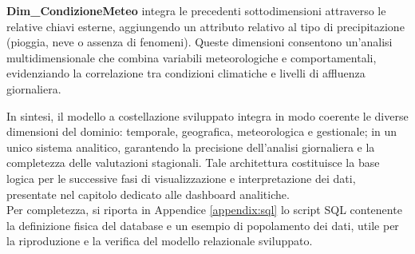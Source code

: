 \textbf{Dim\_CondizioneMeteo} integra le precedenti sottodimensioni attraverso le relative chiavi esterne, aggiungendo un attributo relativo al tipo di precipitazione (pioggia, neve o assenza di fenomeni).
Queste dimensioni consentono un’analisi multidimensionale che combina variabili meteorologiche e comportamentali, evidenziando la correlazione tra condizioni climatiche e livelli di affluenza giornaliera.

In sintesi, il modello a costellazione sviluppato integra in modo coerente le diverse dimensioni del dominio: temporale, geografica, meteorologica e gestionale; in un unico sistema analitico, garantendo la precisione dell’analisi giornaliera e la completezza delle valutazioni stagionali.
Tale architettura costituisce la base logica per le successive fasi di visualizzazione e interpretazione dei dati, presentate nel capitolo dedicato alle dashboard analitiche.\\


Per completezza, si riporta in Appendice \ref{appendix:sql} lo script SQL contenente la definizione fisica del database e un esempio di popolamento dei dati, utile per la riproduzione e la verifica del modello relazionale sviluppato.

